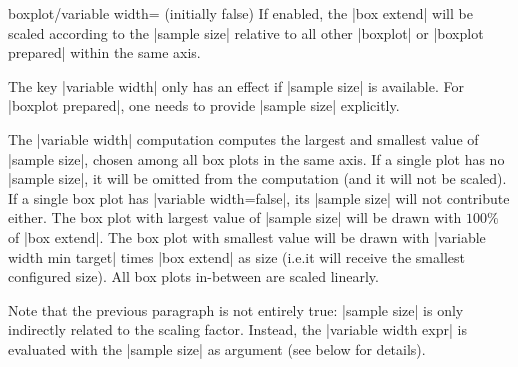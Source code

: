 \begin{pgfplotskey}{boxplot/variable width= (initially false)}
    If enabled, the |box extend| will be scaled according to the |sample size|
    relative to all other |boxplot| or |boxplot prepared| within the same axis.

    The key |variable width| only has an effect if |sample size| is available.
    For |boxplot prepared|, one needs to provide |sample size| explicitly.
\begin{codeexample}[]
\end{codeexample}

    The |variable width| computation computes the largest and smallest value of
    |sample size|, chosen among all box plots in the same axis. If a single
    plot has no |sample size|, it will be omitted from the computation (and it
    will not be scaled). If a single box plot has |variable width=false|, its
    |sample size| will not contribute either. The box plot with largest value
    of |sample size| will be drawn with $100\%$ of |box extend|. The box plot
    with smallest value will be drawn with |variable width min target| times
    |box extend| as size (i.e.\@ it will receive the smallest configured size).
    All box plots in-between are scaled linearly.

    Note that the previous paragraph is not entirely true: |sample size| is
    only indirectly related to the scaling factor. Instead, the
    |variable width expr| is evaluated with the |sample size| as argument (see
    below for details).
\end{pgfplotskey}

